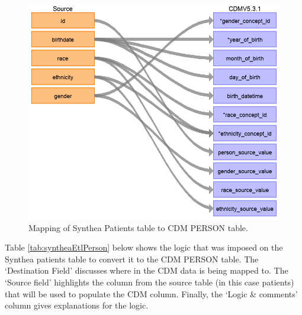 \documentclass[11pt]{book}
\theoremstyle{definition}
\theoremstyle{definition}
\theoremstyle{definition}
\theoremstyle{remark}
\begin{document}
\begin{figure}
\includegraphics[width=1\linewidth]{images/ExtractTransformLoad/syntheaPersonTable} \caption{Mapping of Synthea Patients table to CDM PERSON table.}\label{fig:syntheaPerson}
\end{figure}

Table \ref{tab:syntheaEtlPerson} below shows the logic that was imposed on the Synthea patients table to convert it to the CDM PERSON table. The `Destination Field' discusses where in the CDM data is being mapped to. The `Source field' highlights the column from the source table (in this case patients) that will be used to populate the CDM column. Finally, the `Logic \& comments' column gives explanations for the logic.
\end{document}
